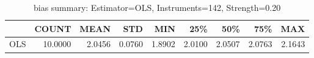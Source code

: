 \begin{table}[ht]
\centering
\caption{bias summary: Estimator=OLS, Instruments=142, Strength=0.20}
\begin{tabular}{lrrrrrrrr}
\toprule
 & COUNT & MEAN & STD & MIN & 25\% & 50\% & 75\% & MAX \\
\midrule
OLS & 10.0000 & 2.0456 & 0.0760 & 1.8902 & 2.0100 & 2.0507 & 2.0763 & 2.1643 \\
\bottomrule
\end{tabular}
\end{table}
